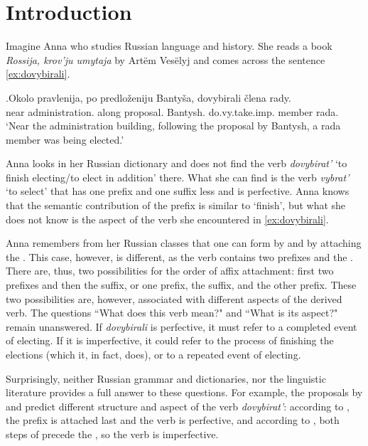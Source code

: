 
\chapter{Introduction} %
\label{Chapter1}
Imagine Anna who studies Russian language and history. She reads a book \textit{Rossija, krov'ju umytaja} by Art\"{e}m Ves\"{e}lyj  and comes across the sentence \ref{ex:dovybirali}.

\exg.\label{ex:dovybirali}Okolo pravlenija, po predlo\v{z}eniju Banty\v{s}a, dovybirali \v{c}lena rady.\\
near administration. along proposal. Bantysh. do.vy.take.imp. member rada.\\
\vspace{0.3em}
`Near the administration building, following the proposal by Bantysh, a rada member was being elected.'

Anna looks in her Russian dictionary and does not find the verb \textit{dovybirat'} `to finish electing/to elect in addition' there.  What she can find is the verb \textit{vybrat'} `to select'  that has one prefix and one suffix less and is perfective. Anna knows that the semantic contribution of the prefix  is similar to `finish', but what she does not know is the aspect of the verb she encountered in \ref{ex:dovybirali}. 

Anna remembers from her Russian classes that one can form  by  and  by attaching the . This case, however, is different, as the verb contains two prefixes and the . There are, thus, two possibilities for the order of affix attachment: first two prefixes and then the suffix, or one prefix, the suffix, and the other prefix. These two possibilities are, however, associated with different aspects of the derived verb. The questions ``What does this verb mean?" and ``What is its aspect?" remain unanswered. If \textit{dovybirali} is perfective, it must refer to a completed event of electing. If it is imperfective, it could refer to the process of finishing the elections (which it, in fact, does), or to a repeated event of electing. 

Surprisingly, neither Russian grammar and dictionaries, nor the linguistic literature provides a full answer to these questions. For example, the proposals by \citet{Svenonius:04b} and \citet{Tatevosov:07} predict different  structure and aspect of the verb \textit{dovybirat'}: according to \citet{Svenonius:04b}, the prefix  is attached last and the verb is perfective, and according to \citet{Tatevosov:07}, both steps of  precede the , so the verb is imperfective.

